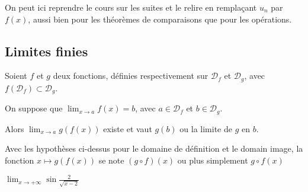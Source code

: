 \documentclass[12pt,a4paper,frenchb]{article}
\begin{document}
On peut ici reprendre le cours sur les suites et le relire en remplaçant
$u_n$ par $f(x)$, aussi bien pour les théorèmes de comparaisons que pour
les opérations.

\subsection{Limites finies}

Soient $f$ et $g$ deux fonctions, définies respectivement sur
$\mathcal{D}_f$ et $\mathcal{D}_g$, avec $f(\mathcal{D}_f)\subset
\mathcal{D}_g$.

On suppose que $\lim_{x\to a}f(x) = b$, avec $a\in\mathcal{D}_f$ et
$b\in\mathcal{D}_g$.

Alors $\lim_{x\to a}g(f(x))$ existe et vaut $g(b)$ ou la limite de $g$
en $b$.

\begin{remarque}
  Avec les hypothèses ci-dessus pour le domaine de définition et le
  domain image, la fonction $x\mapsto g(f(x))$ se note $(g\circ f)(x)$
  ou plus simplement $g\circ f(x)$
\end{remarque}

\begin{exemple}
  $\lim_{x\to+\infty}\sin\frac{2}{\sqrt{x-2}}$
\end{exemple}
\end{document}
